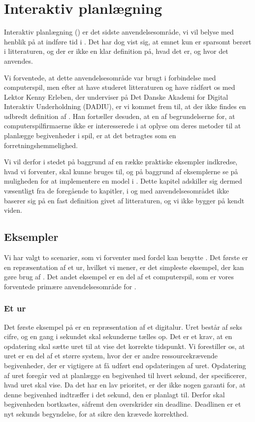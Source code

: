 \chapter{Interaktiv planlægning}
\label{chap:is}
\thispagestyle{empty}
Interaktiv planlægning (\is) er det sidste anvendelsesområde, vi vil belyse med henblik på at indføre tid i \pycsp. Det har dog vist sig, at emnet kun er sparsomt berørt i litteraturen, og der er ikke en klar definition på, hvad det er, og hvor det anvendes. 

Vi forventede, at dette anvendelsesområde var brugt i forbindelse med computerspil, men efter at have studeret litteraturen og have rådført os med Lektor Kenny Erleben, der underviser på Det Danske Akademi for Digital Interaktiv Underholdning (DADIU), er vi kommet frem til, at der ikke findes en udbredt definition af \is. Han fortæller desuden, at en af begrundelserne for, at computerspilfirmaerne ikke er interesserede i at oplyse om deres metoder til at planlægge begivenheder i spil, er at det  betragtes som en  forretningshemmelighed. 

Vi vil derfor i stedet på baggrund af en række praktiske eksempler indkredse, hvad vi forventer, \is skal kunne bruges til, og på baggrund af eksemplerne se på muligheden for at implementere en model i \pycsp. Dette kapitel adskiller sig dermed væsentligt fra de foregående to kapitler, i og med anvendelsesområdet ikke baserer sig på en fast definition givet af litteraturen, og vi ikke bygger på kendt viden.

\section{Eksempler}
Vi har valgt to scenarier, som vi forventer med fordel kan benytte \is. Det første er en repræsentation af et ur, hvilket vi mener, er det simpleste eksempel, der kan gøre brug af \is. Det andet eksempel er en del af et computerspil, som er vores forventede primære anvendelsesområde for \is. 

\subsection{Et ur}
Det første eksempel på \is er en repræsentation af et digitalur. Uret består af seks cifre, og en gang i sekundet skal sekunderne tælles op. Det er et krav, at en opdatering skal sætte uret til at vise det korrekte tidspunkt. Vi forestiller os, at uret er en del af et større system, hvor der er andre ressourcekrævende begivenheder, der er vigtigere at få udført end opdateringen af uret. Opdatering af uret foregår ved at planlægge en begivenhed til hvert sekund, der specificerer, hvad uret skal vise. Da det har en lav prioritet, er der ikke nogen garanti for, at denne begivenhed indtræffer i det sekund, den er planlagt til. Derfor skal begivenheden  bortkastes, såfremt den overskrider sin deadline. Deadlinen er et nyt sekunds begyndelse, for at sikre den krævede korrekthed. 

